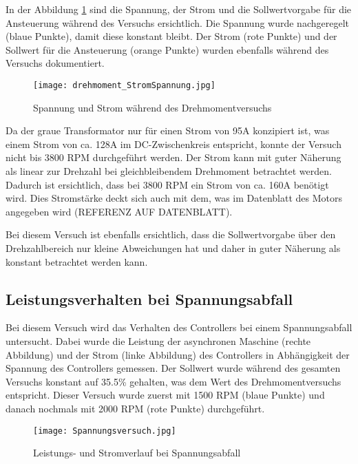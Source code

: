 In der Abbildung \ref{fig:drehmoment/StromSpannung} sind die Spannung, der Strom und die Sollwertvorgabe für die Ansteuerung während des Versuchs ersichtlich. Die Spannung wurde nachgeregelt (blaue Punkte), damit diese konstant bleibt. Der Strom (rote Punkte) und der Sollwert für die Ansteuerung (orange Punkte) wurden ebenfalls während des Versuchs dokumentiert.

\begin{figure}[H]
	\centering
	\texttt{[image: drehmoment\_StromSpannung.jpg]}
	\caption{Spannung und Strom während des Drehmomentversuchs}\label{fig:drehmoment/StromSpannung}
\end{figure}

Da der graue Transformator nur für einen Strom von 95A konzipiert ist, was einem Strom von ca. 128A im DC-Zwischenkreis entspricht, konnte der Versuch nicht bis 3800 RPM durchgeführt werden. Der Strom kann mit guter Näherung als linear zur Drehzahl bei gleichbleibendem Drehmoment betrachtet werden. Dadurch ist ersichtlich, dass bei 3800 RPM ein Strom von ca. 160A benötigt wird. Dies Stromstärke deckt sich auch mit dem, was im Datenblatt des Motors angegeben wird (REFERENZ AUF DATENBLATT).

Bei diesem Versuch ist ebenfalls ersichtlich, dass die Sollwertvorgabe über den Drehzahlbereich nur kleine Abweichungen hat und daher in guter Näherung als konstant betrachtet werden kann.


\subsection{Leistungsverhalten bei Spannungsabfall}\label{subsec:LeistungSpannungabfall}
Bei diesem Versuch wird das Verhalten des Controllers bei einem Spannungsabfall untersucht. Dabei wurde die Leistung der asynchronen Maschine (rechte Abbildung) und der Strom (linke Abbildung) des Controllers in Abhängigkeit der Spannung des Controllers gemessen. Der Sollwert wurde während des gesamten Versuchs konstant auf 35.5\% gehalten, was dem Wert des Drehmomentversuchs entspricht. Dieser Versuch wurde zuerst mit 1500 RPM (blaue Punkte) und danach nochmals mit 2000 RPM (rote Punkte) durchgeführt.

\begin{figure}[H]
	\centering
	\texttt{[image: Spannungsversuch.jpg]}
	\caption{Leistungs- und Stromverlauf bei Spannungsabfall}\label{fig:Spannungsabfall}
\end{figure}

